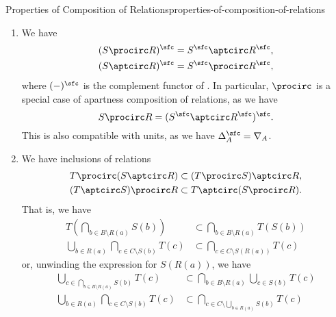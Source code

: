\begin{proposition}{Properties of Composition of Relations}{properties-of-composition-of-relations}
\begin{enumerate}
\begin{align*}
                \bigcup_{a\in\{a\}}R(a)  &= R(a)
            \end{align*}
            for each $a\in A$.
        \item\label{properties-of-composition-of-relations-relation-to-apartness-composition-with-relations}We have
            \begin{align*}
                (S\procirc R)^{\sfc} &= S^{\sfc}\aptcirc R^{\sfc},\\
                (S\aptcirc R)^{\sfc} &= S^{\sfc}\procirc R^{\sfc},
            \end{align*}
            where $(-)^{\sfc}$ is the complement functor of . In particular, $\mathord{\procirc}$ is a special case of apartness composition of relations, as we have
            \[
                S\procirc R%
                =%
                (S^{\sfc}\aptcirc R^{\sfc})^{\sfc}.
            \]%
            This is also compatible with units, as we have $\Delta^{\sfc}_{A}=\nabla_{A}$.
        \item\label{properties-of-composition-of-relations-linear-distributivity}We have inclusions of relations
            \begin{align*}
                T\procirc(S\aptcirc R)  &\subset (T\procirc S)\aptcirc R,\\
                (T\aptcirc S)\procirc R &\subset T\aptcirc(S\procirc R).
            \end{align*}
            That is, we have
            \begin{align*}
                T(\bigcap_{b\in B\setminus R(a)}S(b))  &\subset \bigcap_{b\in B\setminus R(a)}T(S(b))\\
                \bigcup_{b\in R(a)}\bigcap_{c\in C\setminus S(b)}T(c) &\subset \bigcap_{c\in C\setminus S(R(a))}T(c)
            \end{align*}
            or, unwinding the expression for $S(R(a))$, we have
            \begin{align*}
                \bigcup_{c\in\bigcap_{b\in B\setminus R(a)}S(b)}T(c)  &\subset \bigcap_{b\in B\setminus R(a)}\bigcup_{c\in S(b)}T(c)\\
                \bigcup_{b\in R(a)}\bigcap_{c\in C\setminus S(b)}T(c) &\subset \bigcap_{c\in C\setminus\bigcup_{b\in R(a)}S(b)}T(c)
            \end{align*}

\end{enumerate}
\end{proposition}
